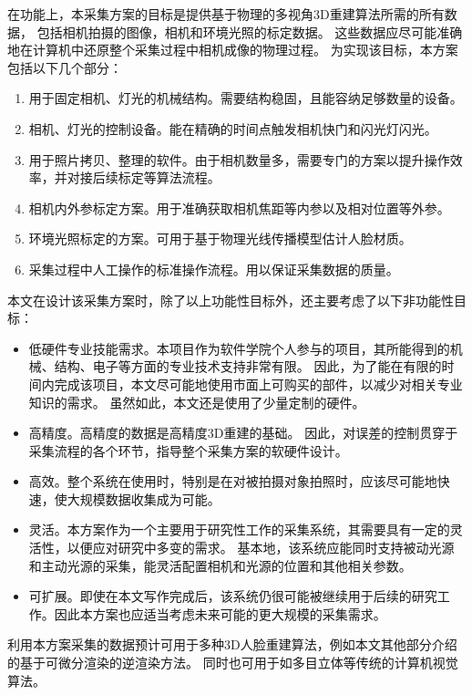 在功能上，本采集方案的目标是提供基于物理的多视角3D重建算法所需的所有数据，
包括相机拍摄的图像，相机和环境光照的标定数据。
这些数据应尽可能准确地在计算机中还原整个采集过程中相机成像的物理过程。
为实现该目标，本方案包括以下几个部分：
\begin{enumerate}
\item 用于固定相机、灯光的机械结构。需要结构稳固，且能容纳足够数量的设备。
\item 相机、灯光的控制设备。能在精确的时间点触发相机快门和闪光灯闪光。
\item 用于照片拷贝、整理的软件。由于相机数量多，需要专门的方案以提升操作效率，并对接后续标定等算法流程。
\item 相机内外参标定方案。用于准确获取相机焦距等内参以及相对位置等外参。
\item 环境光照标定的方案。可用于基于物理光线传播模型估计人脸材质。
\item 采集过程中人工操作的标准操作流程。用以保证采集数据的质量。
\end{enumerate}
本文在设计该采集方案时，除了以上功能性目标外，还主要考虑了以下非功能性目标：
\begin{itemize}
\item 低硬件专业技能需求。本项目作为软件学院个人参与的项目，其所能得到的机械、结构、电子等方面的专业技术支持非常有限。
因此，为了能在有限的时间内完成该项目，本文尽可能地使用市面上可购买的部件，以减少对相关专业知识的需求。
虽然如此，本文还是使用了少量定制的硬件。

\item 高精度。高精度的数据是高精度3D重建的基础。
因此，对误差的控制贯穿于采集流程的各个环节，指导整个采集方案的软硬件设计。

\item 高效。整个系统在使用时，特别是在对被拍摄对象拍照时，应该尽可能地快速，使大规模数据收集成为可能。

\item 灵活。本方案作为一个主要用于研究性工作的采集系统，其需要具有一定的灵活性，以便应对研究中多变的需求。
基本地，该系统应能同时支持被动光源和主动光源的采集，能灵活配置相机和光源的位置和其他相关参数。

\item 可扩展。即使在本文写作完成后，该系统仍很可能被继续用于后续的研究工作。因此本方案也应适当考虑未来可能的更大规模的采集需求。

\end{itemize}

利用本方案采集的数据预计可用于多种3D人脸重建算法，例如本文其他部分介绍的基于可微分渲染的逆渲染方法。
同时也可用于如多目立体等传统的计算机视觉算法。

